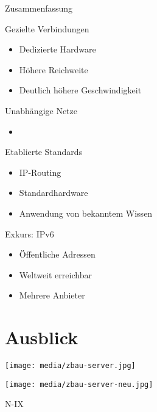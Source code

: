 \documentclass{beamer}
\begin{document}
	\begin{frame}{Zusammenfassung}
		\begin{block}{Gezielte Verbindungen}
		\begin{itemize}
			\item Dedizierte Hardware
			\item Höhere Reichweite
			\item Deutlich höhere Geschwindigkeit
		\end{itemize}
		\end{block}
		\begin{block}{Unabhängige Netze}
		\begin{itemize}
			\item
		\end{itemize}
		\end{block}
		\begin{block}{Etablierte Standards}
		\begin{itemize}
			\item IP-Routing
			\item Standardhardware
			\item Anwendung von bekanntem Wissen
		\end{itemize}
		\end{block}
	\end{frame}

	\begin{frame}{Exkurs: IPv6}
		\begin{itemize}
			\item Öffentliche Adressen
			\item Weltweit erreichbar
			\item Mehrere Anbieter
		\end{itemize}
	\end{frame}

	\section{Ausblick}
	\begin{frame}
		\centering
		\texttt{[image: media/zbau-server.jpg]}
	\end{frame}
	\begin{frame}
		\centering
		\texttt{[image: media/zbau-server-neu.jpg]}
	\end{frame}
	\begin{frame}{N-IX}
	\end{frame}


\end{document}
